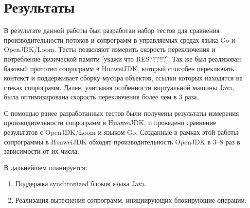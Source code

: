 \section{Результаты}
	В результате данной работы был разработан набор тестов для сравнения производительности потоков и сопрограмм в
	управляемых средах языка Go и OpenJDK/Loom. Тесты позволяют измерить скорость переключения и
	потребление физической памяти [укажи что RES???!!?]. Так же был реализован базовый прототип сопрограмм в
	HuaweiJDK, который способен переключать контекст и поддерживает сборку мусора объектов, ссылки которых находятся
	на стеках сопрограмм. Далее, учитывая особенности виртуальной машины Java, была оптимизирована скорость
	переключения более чем в 3 раза.
	\par
	С помощью ранее разработанных тестов были получены результаты измерения производительности сопрограмм в
	HuaweiJDK, и проведено сравнение результатов с OpenJDK/Loom и языком Go. Созданные в рамках этой
	работы сопрограммы в HuaweiJDK обходят производительность OpenJDK в 3--8 раз в зависимости от их числа.
	
	В дальнейшем планируется:
	\begin{enumerate}
		\item Поддержка synchronized блоков языка Java.
		\item Реализация вытеснения сопрограмм, инициирующих блокирующие операции.
	\end{enumerate}
	
\clearpage

